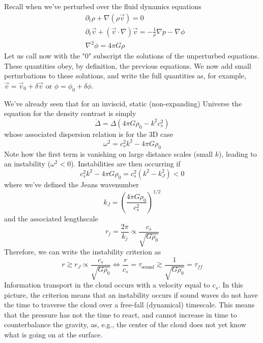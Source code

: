 \par Recall when we've perturbed over the fluid dynamics equations
\begin{align*}
    & \partial_{t}\rho +\nabla(\rho\vec{v}) = 0\\
    & \partial_{t}\vec{v}+(\vec{v}\cdot\nabla)\vec{v} = -\frac{1}{\rho}\nabla p -\nabla\phi\\
    & \nabla^{2}\phi = 4\pi G\rho
\end{align*}
Let us call now with the "0" subscript the solutions of the unperturbed equations. These quantities obey, by definition, the previous equations. We now add small perturbations to these solutions, and write the full quantities as, for example, $\vec{v} = \vec{v}_{0}+\delta\vec{v}$ or $\phi = \phi_{0}+\delta\phi$.
\par We've already seen that for an inviscid, static (non-expanding) Universe the equation for the density contrast is simply 
\begin{equation*}
    \ddot{\Delta} = \Delta(4\pi G\rho_{0}-k^{2}c_{s}^{2})
\end{equation*}
whose associated dispersion relation is for the 3D case
\begin{equation*}
    \omega^{2} = c_{s}^{2}k^{2}-4\pi G\rho_{0}
\end{equation*}
Note how the first term is vanishing on large distance scales (small $k$), leading to an instability ($\omega^{2}<0$). Instabilities are then occurring if 
\begin{equation*}
    c_{s}^{2}k^{2} -4\pi G\rho_{0} = c_{s}^{2}(k^{2}-k_{J}^{2})<0
\end{equation*}
where we've defined the Jeans wavenumber
\begin{equation}
    k_{J} = \left(\frac{4\pi G\rho_{0}}{c_{s}^{2}}\right)^{1/2}
    \label{eq:jeanswavenumber}
\end{equation}
and the associated lengthscale
\begin{equation*}
    r_{j} = \frac{2\pi}{k_{j}} \propto \frac{c_{s}}{\sqrt{G\rho_{0}}}
\end{equation*}
Therefore, we can write the instability criterion as 
\begin{equation*}
    r \gtrsim r_{J} \propto \frac{c_{s}}{\sqrt{G\rho_{0}}} \iff \frac{r}{c_{s}} = \tau_{\text{sound}} \gtrsim \frac{1}{\sqrt{G\rho_{0}}} = \tau_{ff}
\end{equation*}
Information transport in the cloud occurs with a velocity equal to $c_{s}$. In this picture, the criterion means that an instability occurs if sound waves do not have the time to traverse the cloud over a free-fall (dynamical) timescale. This means that the pressure has not the time to react, and cannot increase in time to counterbalance the gravity, as, e.g., the center of the cloud does not yet know what is going on at the surface.

